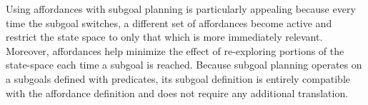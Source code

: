 \documentclass[]{article}
\begin{document}

Using affordances with subgoal planning is particularly appealing because
every time the subgoal switches, a different set of affordances become
active and restrict the state space to only that which is
more immediately relevant. Moreover, affordances help minimize the effect
of re-exploring portions of the state-space each time a subgoal is reached.
Because subgoal planning operates on a subgoals defined with predicates,
its subgoal definition is entirely compatible with the affordance
definition and does not require any additional translation.

\end{document}
